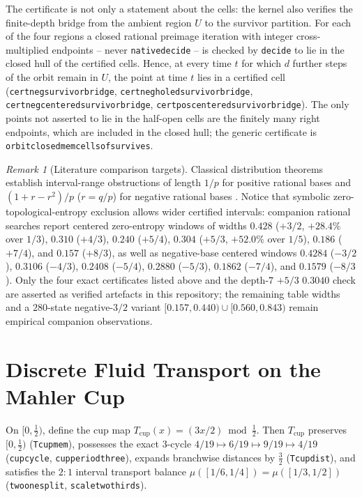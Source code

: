 \documentclass[11pt,a4paper]{article}
\theoremstyle{remark}
\newtheorem{remark}[theorem]{Remark}
\renewcommand{\_}{\textunderscore\allowbreak}
\newcommand{\lean}[1]{\texttt{#1}}
\newcommand{\Nu}{\mu}
\begin{document}
The certificate is not only a statement about the cells: the kernel also verifies the finite-depth bridge from the ambient region $U$ to the survivor partition. For each of the four regions a closed rational preimage iteration with integer cross-multiplied endpoints -- never \lean{native\_decide} -- is checked by \lean{decide} to lie in the closed hull of the certified cells. Hence, at every time $t$ for which $d$ further steps of the orbit remain in $U$, the point at time $t$ lies in a certified cell (\lean{cert\_neg\_5\_3\_survivor\_bridge}, \lean{cert\_neg\_3\_2\_holed\_survivor\_bridge}, \lean{cert\_neg\_3\_2\_centered\_survivor\_bridge}, \lean{cert\_pos\_5\_3\_centered\_survivor\_bridge}). The only points not asserted to lie in the half-open cells are the finitely many right endpoints, which are included in the closed hull; the generic certificate is \lean{orbit\_closed\_mem\_cells\_of\_survives}.

\begin{remark}[Literature comparison targets]
\label{rem:lit}
Classical distribution theorems establish interval-range obstructions of length $1/p$ for positive rational bases \citep{flp1995} and $(1+r-r^2)/p$ ($r=q/p$) for negative rational bases \citep{luzheng2026}. Notice that symbolic zero-topological-entropy exclusion allows wider certified intervals: companion rational searches report centered zero-entropy windows of widths $0.428$ ($+3/2$, $+28.4\%$ over $1/3$), $0.310$ ($+4/3$), $0.240$ ($+5/4$), $0.304$ ($+5/3$, $+52.0\%$ over $1/5$), $0.186$ ($+7/4$), and $0.157$ ($+8/3$), as well as negative-base centered windows $0.4284$ ($-3/2$), $0.3106$ ($-4/3$), $0.2408$ ($-5/4$), $0.2880$ ($-5/3$), $0.1862$ ($-7/4$), and $0.1579$ ($-8/3$). Only the four exact certificates listed above and the depth-$7$ $+5/3$ $0.3040$ check are asserted as verified artefacts in this repository; the remaining table widths and a $280$-state negative-$3/2$ variant $[0.157,0.440)\cup[0.560,0.843)$ remain empirical companion observations.
\end{remark}

\section{Discrete Fluid Transport on the Mahler Cup}
\label{sec:fluid}

On $[0,\tfrac12)$, define the cup map $T_{\mathrm{cup}}(x)=(3x/2)\bmod\tfrac12$. Then $T_{\mathrm{cup}}$ preserves $[0,\tfrac12)$ (\lean{Tcup\_mem}), possesses the exact $3$-cycle $4/19\mapsto 6/19\mapsto 9/19\mapsto 4/19$ (\lean{cup\_cycle}, \lean{cup\_period\_three}), expands branchwise distances by $\tfrac32$ (\lean{Tcup\_dist}), and satisfies the $2{:}1$ interval transport balance $\Nu([1/6,1/4])=\Nu([1/3,1/2])$ (\lean{two\_one\_split}, \lean{scale\_two\_thirds}).
\end{document}
